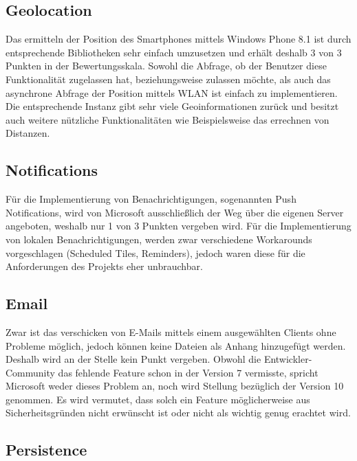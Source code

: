 \subsection{Geolocation}

Das ermitteln der Position des Smartphones mittels Windows Phone 8.1 ist durch entsprechende Bibliotheken sehr einfach umzusetzen und erhält deshalb 3 von 3 Punkten in der Bewertungsskala. Sowohl die Abfrage, ob der Benutzer diese Funktionalität zugelassen hat, beziehungsweise zulassen möchte, als auch das asynchrone Abfrage der Position mittels WLAN ist einfach zu implementieren. Die entsprechende Instanz gibt sehr viele Geoinformationen zurück und besitzt auch weitere nützliche Funktionalitäten wie Beispielsweise das errechnen von Distanzen.

\subsection{Notifications}

Für die Implementierung von Benachrichtigungen, sogenannten Push Notifications, wird von Microsoft ausschließlich der Weg über die eigenen Server angeboten, weshalb nur 1 von 3 Punkten vergeben wird. Für die Implementierung von lokalen Benachrichtigungen, werden zwar verschiedene Workarounds vorgeschlagen (Scheduled Tiles, Reminders), jedoch waren diese für die Anforderungen des Projekts eher unbrauchbar.

\subsection{Email}

Zwar ist das verschicken von E-Mails mittels einem ausgewählten Clients ohne Probleme möglich, jedoch können keine Dateien als Anhang hinzugefügt werden. Deshalb wird an der Stelle kein Punkt vergeben. Obwohl die Entwickler-Community das fehlende Feature schon in der Version 7 vermisste, spricht Microsoft weder dieses Problem an, noch wird Stellung bezüglich der Version 10 genommen. Es wird vermutet, dass solch ein Feature möglicherweise aus Sicherheitsgründen nicht erwünscht ist oder nicht als wichtig genug erachtet wird.

\subsection{Persistence}

